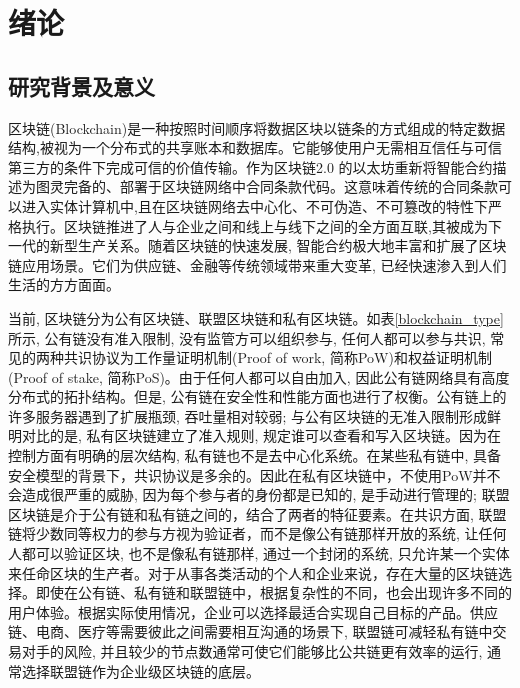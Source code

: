 \chapter{绪论}

\section{研究背景及意义}

区块链(Blockchain)是一种按照时间顺序将数据区块以链条的方式组成的特定数据结构,被视为一个分布式的共享账本和数据库。它能够使用户无需相互信任与可信第三方的条件下完成可信的价值传输\cite{SurveyofEnterpriseBlockchains}。作为区块链2.0 的以太坊\footnotemark[1]重新将智能合约描述为图灵完备的、部署于区块链网络中合同条款代码。这意味着传统的合同条款可以进入实体计算机中,且在区块链网络去中心化、不可伪造、不可篡改的特性下严格执行。区块链推进了人与企业之间和线上与线下之间的全方面互联,其被成为下一代的新型生产关系。随着区块链的快速发展, 智能合约极大地丰富和扩展了区块链应用场景。它们为供应链、金融等传统领域带来重大变革, 已经快速渗入到人们生活的方方面面。

当前, 区块链分为公有区块链、联盟区块链和私有区块链。如表\ref{blockchain_type}所示, 公有链没有准入限制, 没有监管方可以组织参与, 任何人都可以参与共识, 常见的两种共识协议为工作量证明机制(Proof of work, 简称PoW)和权益证明机制(Proof of stake, 简称PoS)。由于任何人都可以自由加入, 因此公有链网络具有高度分布式的拓扑结构。但是, 公有链在安全性和性能方面也进行了权衡。公有链上的许多服务器遇到了扩展瓶颈, 吞吐量相对较弱; 与公有区块链的无准入限制形成鲜明对比的是, 私有区块链建立了准入规则, 规定谁可以查看和写入区块链。因为在控制方面有明确的层次结构, 私有链也不是去中心化系统。在某些私有链中, 具备安全模型的背景下，共识协议是多余的。因此在私有区块链中，不使用PoW并不会造成很严重的威胁, 因为每个参与者的身份都是已知的, 是手动进行管理的; 联盟区块链是介于公有链和私有链之间的，结合了两者的特征要素。在共识方面, 联盟链将少数同等权力的参与方视为验证者，而不是像公有链那样开放的系统, 让任何人都可以验证区块, 也不是像私有链那样, 通过一个封闭的系统, 只允许某一个实体来任命区块的生产者。对于从事各类活动的个人和企业来说，存在大量的区块链选择。即使在公有链、私有链和联盟链中，根据复杂性的不同，也会出现许多不同的用户体验。根据实际使用情况，企业可以选择最适合实现自己目标的产品。供应链、电商、医疗等需要彼此之间需要相互沟通的场景下, 联盟链可减轻私有链中交易对手的风险, 并且较少的节点数通常可使它们能够比公共链更有效率的运行, 通常选择联盟链作为企业级区块链的底层。

